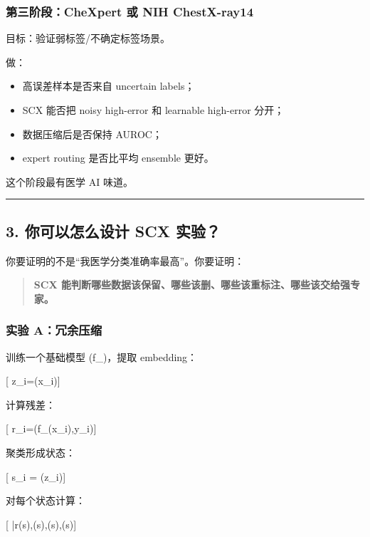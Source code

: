 \documentclass[
  12pt,
]{ctexart}
\providecommand{\tightlist}{%
  \setlength{\itemsep}{0pt}\setlength{\parskip}{0pt}}
\begin{document}
\subsubsection{第三阶段：CheXpert 或 NIH
ChestX-ray14}\label{ux7b2cux4e09ux9636ux6bb5chexpert-ux6216-nih-chestx-ray14}

目标：验证弱标签/不确定标签场景。

做：

\begin{itemize}
\tightlist
\item
  高误差样本是否来自 uncertain labels；
\item
  SCX 能否把 noisy high-error 和 learnable high-error 分开；
\item
  数据压缩后是否保持 AUROC；
\item
  expert routing 是否比平均 ensemble 更好。
\end{itemize}

这个阶段最有医学 AI 味道。

\begin{center}\rule{0.5\linewidth}{0.5pt}\end{center}

\subsection{3. 你可以怎么设计 SCX
实验？}\label{ux4f60ux53efux4ee5ux600eux4e48ux8bbeux8ba1-scx-ux5b9eux9a8c}

你要证明的不是``我医学分类准确率最高''。你要证明：

\begin{quote}
\textbf{SCX
能判断哪些数据该保留、哪些该删、哪些该重标注、哪些该交给强专家。}
\end{quote}

\subsubsection{实验
A：冗余压缩}\label{ux5b9eux9a8c-aux5197ux4f59ux538bux7f29}

训练一个基础模型 (f\_\theta)，提取 embedding：

{[} z\_i=\phi(x\_i){]}

计算残差：

{[} r\_i=\ell(f\_\theta(x\_i),y\_i){]}

聚类形成状态：

{[} s\_i = (z\_i){]}

对每个状态计算：

{[}
\bar r(s),\quad \rho(s),\quad {}(s),\quad {}(s){]}
\end{document}
